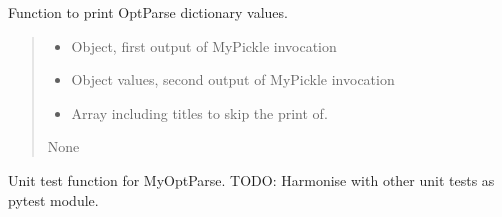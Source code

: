 \documentclass[letterpaper,10pt,english]{sphinxmanual}
\begin{document}
\begin{fulllineitems}
\label{\detokenize{api/killMS.Parset:killMS.Parset.PrintOptParse.PrintOptParse}}
\pysigstartsignatures
{}
\pysigstopsignatures
\sphinxAtStartPar
Function to print OptParse dictionary values.
\begin{quote}\begin{description}
\begin{itemize}
\item {} 
\sphinxAtStartPar
{} \textendash{} Object, first output of MyPickle invocation

\item {} 
\sphinxAtStartPar
{} \textendash{} Object values, second output of MyPickle invocation

\item {} 
\sphinxAtStartPar
{} \textendash{} Array including titles to skip the print of.

\end{itemize}

\sphinxAtStartPar
None

\end{description}\end{quote}

\end{fulllineitems}


\begin{fulllineitems}
\label{\detokenize{api/killMS.Parset:killMS.Parset.PrintOptParse.test}}
\pysigstartsignatures
{}
\pysigstopsignatures
\sphinxAtStartPar
Unit test function for MyOptParse.
TODO: Harmonise with other unit tests as pytest module.

\end{fulllineitems}

\end{document}
